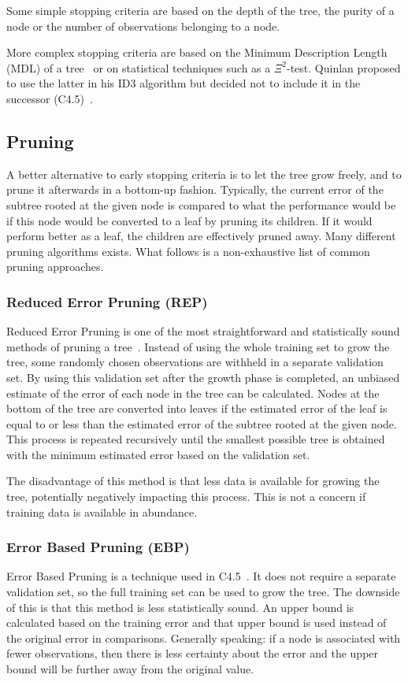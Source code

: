 Some simple stopping criteria are based on the depth of the tree, the purity of a node or the number of observations belonging to a node. 

More complex stopping criteria are based on the Minimum Description Length (MDL) of a tree~\cite{mdlstopping} or on statistical techniques such as a $\Xi^2$-test. Quinlan proposed to use the latter in his ID3 algorithm but decided not to include it in the successor (C4.5)~\cite{id3ter, c45}.

\subsection{Pruning}
A better alternative to early stopping criteria is to let the tree grow freely, and to prune it afterwards in a bottom-up fashion. Typically, the current error of the subtree rooted at the given node is compared to what the performance would be if this node would be converted to a leaf by pruning its children. If it would perform better as a leaf, the children are effectively pruned away. Many different pruning algorithms exists. What follows is a non-exhaustive list of common pruning approaches.

\subsubsection{Reduced Error Pruning (REP)}
Reduced Error Pruning is one of the most straightforward and statistically sound methods of pruning a tree~\cite{quinlan1987simplifying, repanalysis, elomaa2001analysis}. Instead of using the whole training set to grow the tree, some randomly chosen observations are withheld in a separate validation set. By using this validation set after the growth phase is completed, an unbiased estimate of the error of each node in the tree can be calculated. Nodes at the bottom of the tree are converted into leaves if the estimated error of the leaf is equal to or less than the estimated error of the subtree rooted at the given node. This process is repeated recursively until the smallest possible tree is obtained with the minimum estimated error based on the validation set.

The disadvantage of this method is that less data is available for growing the tree, potentially negatively impacting this process. This is not a concern if training data is available in abundance.

\subsubsection{Error Based Pruning (EBP)}
Error Based Pruning is a technique used in C4.5~\cite{c45}. It does not require a separate validation set, so the full training set can be used to grow the tree. The downside of this is that this method is less statistically sound. An upper bound is calculated based on the training error and that upper bound is used instead of the original error in comparisons. Generally speaking: if a node is associated with fewer observations, then there is less certainty about the error and the upper bound will be further away from the original value. %

